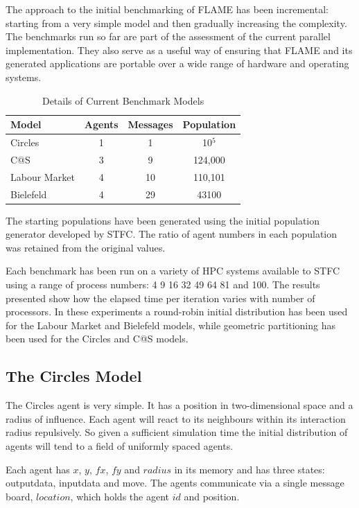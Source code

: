 The approach to the initial benchmarking of FLAME has been incremental: starting from a very simple model and then gradually increasing the complexity. The benchmarks run so far are part of the assessment of the current parallel implementation. They also serve as a useful way of ensuring that FLAME and its generated applications are portable over a wide range of hardware and operating systems. 

\begin{table}[ht]
 \centering
  \begin{tabular}{l|ccc}
  Model     & Agents & Messages & Population   \\\hline
   Circles     &   1    &   1      &  10$^5$    \\
   C@S       &   3    &   9      &  124,000 \\
   Labour Market &   4    &   10     &  110,101 \\ 
   Bielefeld     &   4    &   29     &  43100     \\\hline
   \end{tabular}
   \caption{Details of Current Benchmark Models}
 \end{table}

The starting populations have been generated using the initial population generator developed by STFC. The ratio of agent numbers in each population was retained from the original values.

Each benchmark has been run on a variety of HPC systems available to STFC using a range of process numbers: 4 9 16 32 49 64 81 and 100. The results presented show how the elapsed time per iteration varies with number of processors. In these experiments a round-robin initial distribution has been used for the Labour Market and Bielefeld models, while geometric partitioning has been used for the Circles and C@S models.

\subsection{The Circles Model}

The Circles agent is very simple. It has a position in two-dimensional space and a radius of influence. Each agent will react to its neighbours within its interaction radius repulsively. So given a sufficient simulation time the initial distribution of agents will tend to a field of uniformly spaced agents.

Each agent has $x$, $y$, $fx$, $fy$ and $radius$ in its memory and has three states: outputdata, inputdata and move. The agents communicate via a single message board, $location$, which holds the agent $id$ and position.

